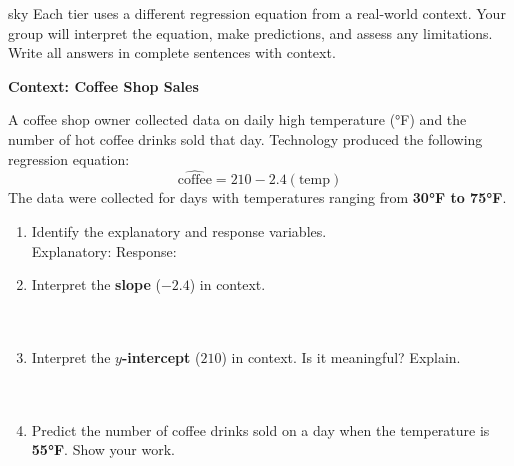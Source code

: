 \documentclass[10pt]{article}
\begin{document}
\namepartnerperiod

\vspace{0.18in}

\begin{scenariobox}[Context]{sky}
\small
Each tier uses a different regression equation from a real-world context. Your group will
interpret the equation, make predictions, and assess any limitations. Write all answers in
complete sentences with context.
\end{scenariobox}

\vspace{0.12in}

\begin{tcolorbox}[colback=white, colframe=black!40, boxrule=0.8pt, arc=2mm,
    left=4mm, right=4mm, top=3mm, bottom=3mm,
    title={\textbf{Tier R --- Remediate}}, fonttitle=\bfseries, halign title=center]
\small

\textbf{Context: Coffee Shop Sales}

A coffee shop owner collected data on daily high temperature (°F) and the number of hot
coffee drinks sold that day. Technology produced the following regression equation:
\[
  \widehat{\text{coffee}} = 210 - 2.4(\text{temp})
\]
The data were collected for days with temperatures ranging from \textbf{30°F to 75°F}.

\vspace{10pt}

\begin{enumerate}[leftmargin=1.6em, itemsep=0.2in]

  \item Identify the explanatory and response variables.\\[6pt]
        Explanatory: \blank{5.5cm} \quad Response: \blank{5.5cm}

  \item Interpret the \textbf{slope} ($-2.4$) in context.\\[8pt]
        \writeline\\[3pt]\writeline\\[3pt]\writeline

  \item Interpret the \textbf{$y$-intercept} ($210$) in context.
        Is it meaningful? Explain.\\[8pt]
        \writeline\\[3pt]\writeline\\[3pt]\writeline

  \item Predict the number of coffee drinks sold on a day when the temperature is \textbf{55°F}.
        Show your work.\\[8pt]
        \writeline\\[3pt]\writeline

\end{enumerate}
\end{tcolorbox}
\end{document}
